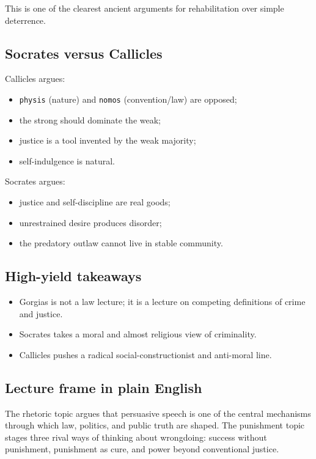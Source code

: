 \documentclass[11pt]{article}
\begin{document}
This is one of the clearest ancient arguments for rehabilitation over simple deterrence.

\subsection{Socrates versus Callicles}

Callicles argues:

\begin{itemize}
\item \texttt{physis} (nature) and \texttt{nomos} (convention/law) are opposed;
\item the strong should dominate the weak;
\item justice is a tool invented by the weak majority;
\item self-indulgence is natural.
\end{itemize}

Socrates argues:

\begin{itemize}
\item justice and self-discipline are real goods;
\item unrestrained desire produces disorder;
\item the predatory outlaw cannot live in stable community.
\end{itemize}

\subsection{High-yield takeaways}

\begin{itemize}
\item Gorgias is not a law lecture; it is a lecture on competing definitions of crime and justice.
\item Socrates takes a moral and almost religious view of criminality.
\item Callicles pushes a radical social-constructionist and anti-moral line.
\end{itemize}

\subsection{Lecture frame in plain English}

The rhetoric topic argues that persuasive speech is one of the central mechanisms through which law, politics, and public truth are shaped. The punishment topic stages three rival ways of thinking about wrongdoing: success without punishment, punishment as cure, and power beyond conventional justice.
\end{document}
